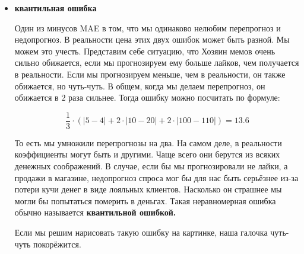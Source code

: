 \documentclass[12pt, a4paper, oneside]{article}
\theoremstyle{plain} %
\theoremstyle{definition}
\newcommand{\indef}[1]{\textbf{ \color{green} #1}}
\begin{document}
\begin{solution}
\begin{itemize}
\begin{center}
\end{center}
	 	
\item \indef{квантильная ошибка}

Один из минусов MAE в том, что мы одинаково нелюбим перепрогноз и недопрогноз. В реальности цена этих двух ошибок может быть разной. Мы можем это учесть. Представим себе ситуацию, что Хозяин мемов очень сильно обижается, если мы прогнозируем ему больше лайков, чем получается в реальности. Если мы прогнозируем меньше, чем в реальности, он также обижается, но чуть-чуть. В общем, когда мы делаем перепрогноз, он обижается в $2$ раза сильнее. Тогда ошибку можно посчитать по формуле: 

$$ 
\frac{1}{3} \cdot (|5 - 4| + 2 \cdot |10 - 20| + 2 \cdot |100 - 110|) = 13.6 
$$

То есть мы умножили перепрогнозы на два. На самом деле, в реальности коэффициенты могут быть и другими. Чаще всего они берутся из всяких денежных соображений. В случае, если бы мы прогнозировали не лайки, а продажи в магазине, недопрогноз спроса мог бы для нас быть серьёзнее из-за потери кучи денег в виде лояльных клиентов. Насколько он страшнее мы могли бы попытаться померить в деньгах. Такая неравномерная ошибка обычно называется \indef{квантильной ошибкой.}

Если мы решим нарисовать такую ошибку на картинке, наша галочка чуть-чуть покорёжится. 
	
\begin{center}
\end{center}
\end{itemize}
\end{solution}
\end{document}
